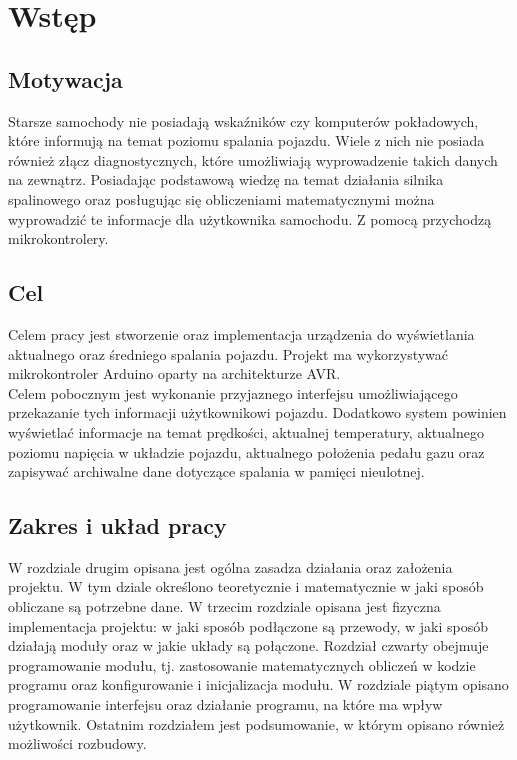 \chapter{Wstęp}
\section{Motywacja}
Starsze samochody nie posiadają wskaźników czy komputerów pokładowych, które informują na temat poziomu spalania pojazdu. Wiele z nich nie posiada również złącz diagnostycznych, które umożliwiają wyprowadzenie takich danych na zewnątrz. Posiadając podstawową wiedzę na temat działania silnika spalinowego oraz posługując się obliczeniami matematycznymi można wyprowadzić te informacje dla użytkownika samochodu. Z pomocą przychodzą mikrokontrolery.
\section{Cel}
Celem pracy jest stworzenie oraz implementacja urządzenia do wyświetlania aktualnego oraz średniego spalania pojazdu. Projekt ma wykorzystywać mikrokontroler Arduino oparty na architekturze AVR.
\\Celem pobocznym jest wykonanie przyjaznego interfejsu umożliwiającego przekazanie tych informacji użytkownikowi pojazdu. Dodatkowo system powinien wyświetlać informacje na temat prędkości, aktualnej temperatury, aktualnego poziomu napięcia w układzie pojazdu, aktualnego położenia pedału gazu oraz zapisywać archiwalne dane dotyczące spalania w pamięci nieulotnej.
\section{Zakres i układ pracy}
W rozdziale drugim opisana jest ogólna zasadza działania oraz założenia projektu. W tym dziale określono teoretycznie i matematycznie w jaki sposób obliczane są potrzebne dane. W trzecim rozdziale opisana jest fizyczna implementacja projektu: w jaki sposób podłączone są przewody, w jaki sposób działają moduły oraz w jakie układy są połączone. Rozdział czwarty obejmuje programowanie modułu, tj. zastosowanie matematycznych obliczeń w kodzie programu oraz konfigurowanie i inicjalizacja modułu. W rozdziale piątym opisano programowanie interfejsu oraz działanie programu, na które ma wpływ użytkownik. Ostatnim rozdziałem jest podsumowanie, w którym opisano również możliwości rozbudowy.